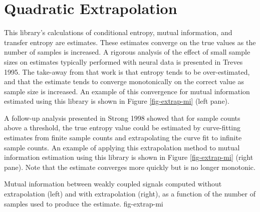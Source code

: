 
\chapter{Quadratic Extrapolation}
\label{sect-extrap}

This library's calculations of conditional entropy, mutual information,
and transfer entropy are estimates. These estimates converge on the true
values as the number of samples is increased. A rigorous analysis of the
effect of small sample sizes on estimates typically performed with neural
data is presented in Treves 1995. The take-away from that work is that
entropy tends to be over-estimated, and that the estimate tends to converge
monotonically on the correct value as sample size is increased. An example
of this convergence for mutual information estimated using this library is
shown in Figure \ref{fig-extrap-mi} (left pane).

A follow-up analysis presented in Strong 1998 showed that for sample counts
above a threshold, the true entropy value could be estimated by
curve-fitting estimates from finite sample counts and extrapolating the
curve fit to infinite sample counts. An example of applying this
extrapolation method to mutual information estimation using this library is
shown in Figure \ref{fig-extrap-mi} (right pane). Note that the estimate
converges more quickly but is no longer monotonic.

{Mutual information between weakly coupled signals computed without
extrapolation (left) and with extrapolation (right), as a function of the
number of samples used to produce the estimate.}
{fig-extrap-mi}

